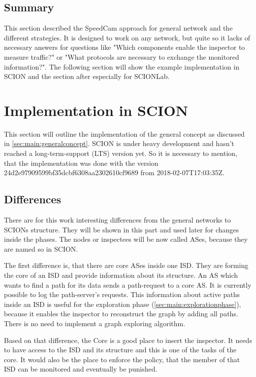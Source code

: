 \documentclass[thesis.tex]{subfiles}
\begin{document}
\subsection{Summary}
This section described the SpeedCam approach for general network and the different strategies. It is designed to work on any network, but quite so it lacks of necessary answers for questions like "Which components enable the inspector to measure traffic?" or "What protocols are necessary to exchange the monitored information?". The following section will show the example implementation in SCION and the section after especially for SCIONLab.

\section{Implementation in SCION} \label{sec:main:scionimpl}

This section will outline the implementation of the general concept as discussed in \autoref{sec:main:generalconcept}. SCION is under heavy development and hasn't reached a long-term-support (LTS) version yet. So it is necessary to mention, that the implementation was done with the version  {\scriptsize 24d2e97909599bf35dcbf6308aa2302610cf9689} from {\scriptsize 2018-02-07T17:03:35Z}. 

\subsection{Differences}

There are for this work interesting differences from the general networks to SCIONs structure. They will be shown in this part and used later for changes inside the phases. The nodes or inspectees will be now called ASes, because they are named so in SCION.

The first difference is, that there are core ASes inside one ISD. They are forming the core of an ISD and provide information about its structure. An AS which wants to find a path for its data sends a path-request to a core AS. It is currently possible to log the path-server's requests. This information about active paths inside an ISD is useful for the exploration phase (\autoref{sec:main:explorationphase}), because it enables the inspector to reconstruct the graph by adding all paths. There is no need to implement a graph exploring algorithm.

Based on that difference, the Core is a good place to insert the inspector. It needs to have access to the ISD and its structure and this is one of the tasks of the core. It would also be the place to enforce the policy, that the member of that ISD can be monitored and eventually be punished. 
\end{document}
